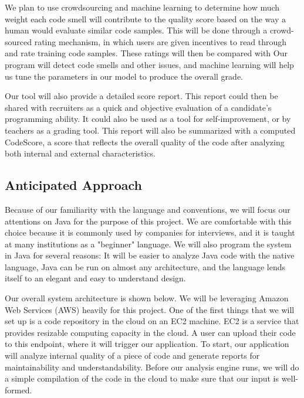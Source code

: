 \documentclass{sig-alternate}
\begin{document}
We plan to use crowdsourcing and machine learning to determine how much weight each code smell will contribute to the quality score based on the way a human would evaluate similar code samples. This will be done through a crowd-sourced rating mechanism, in which users are given incentives to read through and rate training code samples. These ratings will then be compared with Our program will detect code smells and other issues, and machine learning will help us tune the parameters in our model to produce the overall grade. 

Our tool will also provide a detailed score report. This report could then be shared with recruiters as a quick and objective evaluation of a candidate's programming ability. It could also be used as a tool for self-improvement, or by teachers as a grading tool. This report will also be summarized with a computed CodeScore, a score that reflects the overall quality of the code after analyzing both internal and external characteristics.

\subsection{Anticipated Approach}
\label{subsec:approach}
Because of our familiarity with the language and conventions, we will focus our attentions on Java for the purpose of this project. We are comfortable with this choice because it is commonly used by companies for interviews, and it is taught at many institutions as a "beginner" language. We will also program the system in Java for several reasons: It will be easier to analyze Java code with the native language, Java can be run on almost any architecture, and the language lends itself to an elegant and easy to understand design.

Our overall system architecture is shown below. We will be leveraging Amazon Web Services (AWS) heavily for this project. One of the first things that we will set up is a code repository in the cloud on an EC2 machine. EC2 is a service that provides resizable computing capacity in the cloud. A user can upload their code to this endpoint, where it will trigger our application. To start, our application will analyze internal quality of a piece of code and generate reports for maintainability and understandability. Before our analysis engine runs, we will do a simple compilation of the code in the cloud to make sure that our input is well-formed.
\end{document}
